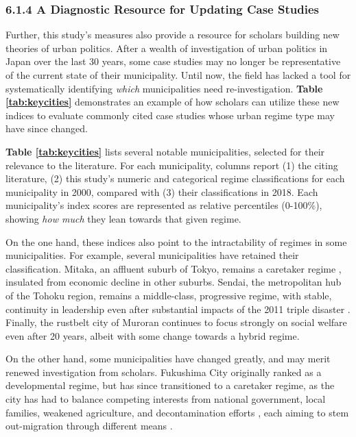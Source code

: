 \documentclass[preprint, 3p,
authoryear]{elsarticle} %
\begin{document}
\renewcommand{\arraystretch}{1}

\doublespacing

\hypertarget{a-diagnostic-resource-for-updating-case-studies}{%
\subsubsection{6.1.4 A Diagnostic Resource for Updating Case
Studies}\label{a-diagnostic-resource-for-updating-case-studies}}

Further, this study's measures also provide a resource for scholars
building new theories of urban politics. After a wealth of investigation
of urban politics in Japan over the last 30 years, some case studies may
no longer be representative of the current state of their municipality.
Until now, the field has lacked a tool for systematically identifying
\emph{which} municipalities need re-investigation.
\textbf{Table \ref{tab:keycities}} demonstrates an example of how
scholars can utilize these new indices to evaluate commonly cited case
studies whose urban regime type may have since changed.

\textbf{Table \ref{tab:keycities}} lists several notable municipalities,
selected for their relevance to the literature. For each municipality,
columns report (1) the citing literature, (2) this study's numeric and
categorical regime classifications for each municipality in 2000,
compared with (3) their classifications in 2018. Each municipality's
index scores are represented as relative percentiles (0-100\%), showing
\emph{how much} they lean towards that given regime.

On the one hand, these indices also point to the intractability of
regimes in some municipalities. For example, several municipalities have
retained their classification. Mitaka, an affluent suburb of Tokyo,
remains a caretaker regime
\citep{steiner_1957, fukuchi_and_yamaguchi_1997, ohashi_and_phelps_2021},
insulated from economic decline in other suburbs. Sendai, the
metropolitan hub of the Tohoku region, remains a middle-class,
progressive regime, with stable, continuity in leadership even after
substantial impacts of the 2011 triple disaster
\citep{morris_2012, tsuji_2017}. Finally, the rustbelt city of Muroran
\citep{edgington_2013} continues to focus strongly on social welfare
even after 20 years, albeit with some change towards a hybrid regime.

On the other hand, some municipalities have changed greatly, and may
merit renewed investigation from scholars. Fukushima City originally
ranked as a developmental regime, but has since transitioned to a
caretaker regime, as the city has had to balance competing interests
from national government, local families, weakened agriculture, and
decontamination efforts \citep{otsuki_2016, abeysinghe_2022}, each
aiming to stem out-migration through different means \citep{zhang_2014}.
\end{document}

